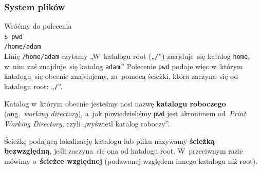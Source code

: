 \documentclass[10pt,t]{beamer}
\begin{document}






\begin{frame}
  \frametitle{System plików}


  Wróćmy do polecenia \\
  \texttt{\$ pwd} \\
  \texttt{/home/adam} \\
  Linię \texttt{/home/adam} czytamy „W~katalogu root („\texttt{/}”)
  znajduje~się katalog \texttt{home}, w~nim zaś znajduje~się katalog
  \texttt{adam}.” Polecenie \texttt{pwd} podaje więc w~którym katalogu~się
  obecnie znajdujemy, za~pomocą ścieżki, która zaczyna~się od katalogu root:
  „\texttt{/}”.

  Katalog w~którym obecnie jesteśmy nosi nazwę \textbf{katalogu roboczego}
  (ang.~\textit{working directory}), a~jak powiedzieliśmy \texttt{pwd} jest
  akronimem od~\textit{Print Working Directory}, czyli „wyświetl katalog
  roboczy”.

  Ścieżkę podającą lokalizację katalogu lub pliku nazywamy
  \textbf{ścieżką bezwzględną}, jeśli zaczyna~się ona od katalogu root.
  W~przeciwnym razie mówimy o~\textbf{ścieżce względnej} (podawanej
  względem innego katalogu niż root).

\end{frame}
\end{document}

